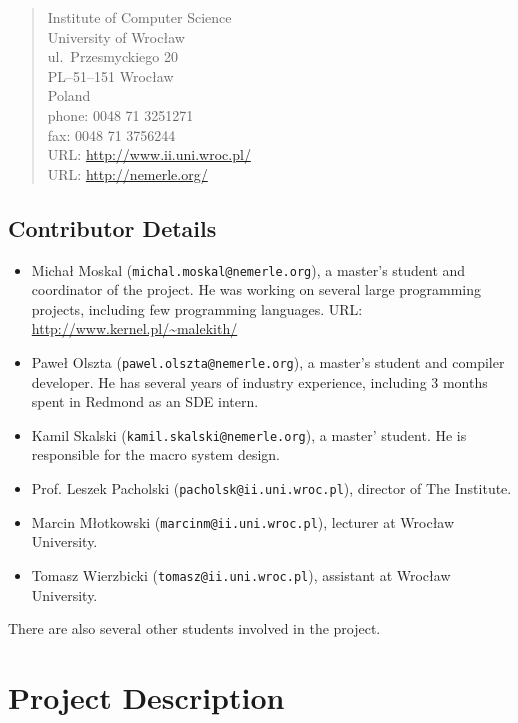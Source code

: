 \documentclass[a4paper,11pt]{article}
\begin{document}
\begin{quote}
Institute of Computer Science\\
University of Wroc\l aw\\
ul.\ Przesmyckiego 20\\
PL--51--151 Wroc\l aw\\
Poland\\[2ex]
phone: 0048 71 3251271\\
fax:   0048 71 3756244\\
URL: \url{http://www.ii.uni.wroc.pl/}\\
URL: \url{http://nemerle.org/}
\end{quote}


\subsection{Contributor Details}
\begin{itemize}

\item
Micha{\l} Moskal (\texttt{michal.moskal@nemerle.org}), a master's
student and coordinator of the project. He was working on several large
programming projects, including few programming languages. URL: 
\url{http://www.kernel.pl/~malekith/}

\item
Pawe{\l} Olszta (\texttt{pawel.olszta@nemerle.org}), a master's student
and compiler developer. He has several years of industry experience, 
including 3 months spent in Redmond as an SDE intern. 

\item
Kamil Skalski (\texttt{kamil.skalski@nemerle.org}), a master' student.
He is responsible for the macro system design.

\item
Prof. Leszek Pacholski (\texttt{pacholsk@ii.uni.wroc.pl}), director of The Institute.

\item
Marcin M\l otkowski (\texttt{marcinm@ii.uni.wroc.pl}), lecturer at Wroc\l aw University.

\item
Tomasz Wierzbicki (\texttt{tomasz@ii.uni.wroc.pl}), assistant at Wroc\l aw University.

\end{itemize}

There are also several other students involved in the project.


\section{Project Description}
\end{document}
